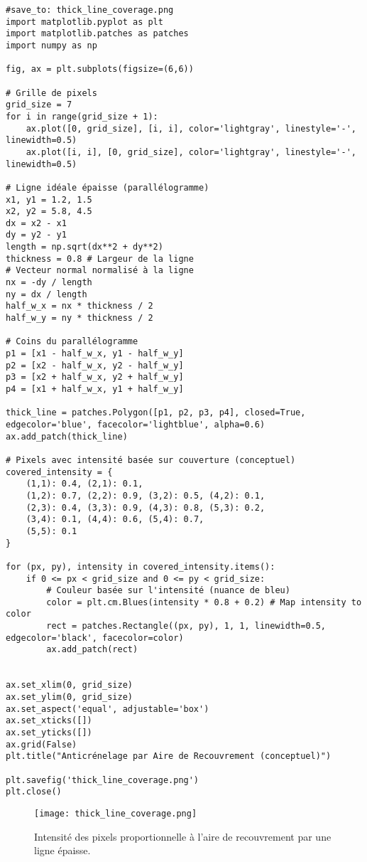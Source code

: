 \documentclass{article}
\begin{document}
\begin{verbatim}
#save_to: thick_line_coverage.png
import matplotlib.pyplot as plt
import matplotlib.patches as patches
import numpy as np

fig, ax = plt.subplots(figsize=(6,6))

# Grille de pixels
grid_size = 7
for i in range(grid_size + 1):
    ax.plot([0, grid_size], [i, i], color='lightgray', linestyle='-', linewidth=0.5)
    ax.plot([i, i], [0, grid_size], color='lightgray', linestyle='-', linewidth=0.5)

# Ligne idéale épaisse (parallélogramme)
x1, y1 = 1.2, 1.5
x2, y2 = 5.8, 4.5
dx = x2 - x1
dy = y2 - y1
length = np.sqrt(dx**2 + dy**2)
thickness = 0.8 # Largeur de la ligne
# Vecteur normal normalisé à la ligne
nx = -dy / length
ny = dx / length
half_w_x = nx * thickness / 2
half_w_y = ny * thickness / 2

# Coins du parallélogramme
p1 = [x1 - half_w_x, y1 - half_w_y]
p2 = [x2 - half_w_x, y2 - half_w_y]
p3 = [x2 + half_w_x, y2 + half_w_y]
p4 = [x1 + half_w_x, y1 + half_w_y]

thick_line = patches.Polygon([p1, p2, p3, p4], closed=True, edgecolor='blue', facecolor='lightblue', alpha=0.6)
ax.add_patch(thick_line)

# Pixels avec intensité basée sur couverture (conceptuel)
covered_intensity = {
    (1,1): 0.4, (2,1): 0.1,
    (1,2): 0.7, (2,2): 0.9, (3,2): 0.5, (4,2): 0.1,
    (2,3): 0.4, (3,3): 0.9, (4,3): 0.8, (5,3): 0.2,
    (3,4): 0.1, (4,4): 0.6, (5,4): 0.7,
    (5,5): 0.1
}

for (px, py), intensity in covered_intensity.items():
    if 0 <= px < grid_size and 0 <= py < grid_size:
        # Couleur basée sur l'intensité (nuance de bleu)
        color = plt.cm.Blues(intensity * 0.8 + 0.2) # Map intensity to color
        rect = patches.Rectangle((px, py), 1, 1, linewidth=0.5, edgecolor='black', facecolor=color)
        ax.add_patch(rect)


ax.set_xlim(0, grid_size)
ax.set_ylim(0, grid_size)
ax.set_aspect('equal', adjustable='box')
ax.set_xticks([])
ax.set_yticks([])
ax.grid(False)
plt.title("Anticrénelage par Aire de Recouvrement (conceptuel)")

plt.savefig('thick_line_coverage.png')
plt.close()
\end{verbatim}

\begin{figure}[H]
\centering
\texttt{[image: thick\_line\_coverage.png]}
\caption{Intensité des pixels proportionnelle à l'aire de recouvrement par une ligne épaisse.}
\label{fig:thick_line_coverage}
\end{figure}
\end{document}
